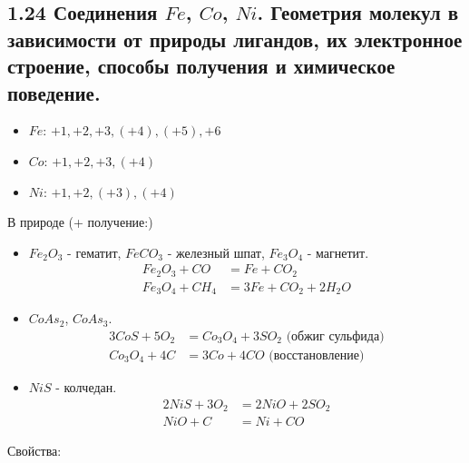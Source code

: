 \subsection{1.24 Соединения $Fe$, $Co$, $Ni$. Геометрия молекул в зависимости от природы лигандов, их электронное строение, способы получения и химическое поведение.}
\begin{itemize}
	\item $Fe$: $+1, +2, +3, (+4), (+5), +6$	
	\item $Co$: $+1, +2, +3, (+4)$
	\item $Ni$: $+1, +2, (+3), (+4)$
\end{itemize}
В природе (+ получение:)
\begin{itemize}
	\item $Fe_2O_3$ - гематит, $FeCO_3$ - железный шпат, $Fe_3O_4$ - магнетит.
	\begin{align*}
	Fe_2O_3 + CO &= Fe + CO_2 \\
	Fe_3O_4 + CH_4 &= 3 Fe + CO_2 + 2 H_2O	
	\end{align*}
	\item $CoAs_2$, $CoAs_3$.
	\begin{align*}
	3 CoS + 5O_2 &= Co_3O_4 + 3SO_2 \text{ (обжиг сульфида)} \\
	Co_3O_4 + 4 C &= 3 Co + 4 CO \text{ (восстановление)}
	\end{align*}	
	\item $NiS$ - колчедан.
	\begin{align*}
	2 NiS + 3O_2 &= 2NiO + 2SO_2 \\
	NiO +  C &= Ni + CO 
	\end{align*}
\end{itemize}
Свойства:
